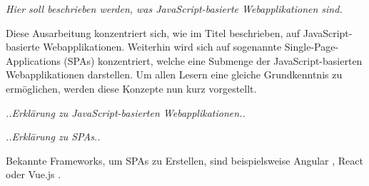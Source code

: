 \textit{Hier soll beschrieben werden, was JavaScript-basierte Webapplikationen sind.}

Diese Ausarbeitung konzentriert sich, wie im Titel beschrieben, auf JavaScript-basierte Webapplikationen. Weiterhin wird sich auf sogenannte Single-Page-Applications (SPAs) konzentriert, welche eine Submenge der JavaScript-basierten Webapplikationen darstellen. Um allen Lesern eine gleiche Grundkenntnis zu ermöglichen, werden diese Konzepte nun kurz vorgestellt.

\textit{..Erklärung zu JavaScript-basierten Webapplikationen..}

\textit{..Erklärung zu SPAs..}

Bekannte Frameworks, um SPAs zu Erstellen, sind beispielsweise Angular \cite{AngularHomepage}, React \cite{ReactHomepage} oder Vue.js \cite{VueJSHomepage}.